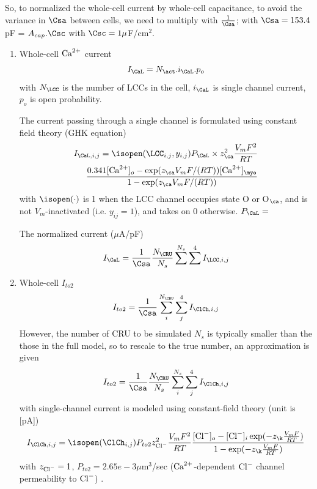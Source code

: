\begin{framed}
  So, to normalized the whole-cell current by whole-cell capacitance,
  to avoid the variance in $\Csa$ between cells, we need to multiply
  with $\frac{1}{\Csa}$; with $\Csa=153.4$pF = $A_{cap}.\Csc$ with
  $\Csc=1\mu$F/cm$^2$.
\end{framed}

\begin{enumerate}
\item Whole-cell ${\text{Ca}^{2+}}$ current~\citep{handrock1998}
  \begin{equation}
    \label{eq:1324}
    I_\CaL = N_\act . i_\CaL . p_o 
  \end{equation}
  with $N_\LCC$ is the number of LCCs in the cell, $i_\CaL$ is single
  channel current, $p_o$ is open probability.

  The current passing through a single channel is formulated using
  constant field theory (GHK equation)
  \begin{equation}
    \label{eq:1334}
    \begin{split}
      I_{\CaL,i,j} = \isopen(\LCC_{i,j},y_{i,j}) P_\CaL \times z_\ca^2
      \frac{V_mF^2}{RT} \\
      \frac{0.341[\Ca]_o-\exp(z_\ca V_mF/(RT))
        [\Ca]_\myo}{1-\exp(z_\ca V_mF/(RT))}
    \end{split}
  \end{equation}
  with $\isopen(\cdot)$ is 1 when the LCC channel occupies state O or
  O$_\ca$, and is not $V_m$-inactivated (i.e. $y_{ij}=1$), and takes
  on 0 otherwise. $P_\CaL=$

  The normalized current ($\mu$A/pF)
  \begin{equation}
    \label{eq:1335}
    I_\CaL = \frac{1}{\Csa}\frac{N_\CRU}{N_s} \sum^{N_s} \sum^4 I_{\LCC,i,j}
  \end{equation}



\item Whole-cell $I_{to2}$
  \begin{equation}
    \label{eq:1331}
    I_{to2} = \frac{1}{\Csa} \sum^{N_\CRU}_i \sum^4_j I_{\ClCh, i, j}
  \end{equation}
  However, the number of CRU to be simulated $N_s$ is typically smaller than
  the those in the full model, so to rescale to the true number, an
  approximation is given
  \begin{equation}
    \label{eq:1330}
    I_{to2} =\frac{1}{\Csa} \frac{N_\CRU}{N_s}\sum^{N_s}_i \sum^4_j I_{\ClCh, i, j}
  \end{equation}
  with single-channel current is modeled using constant-field theory
  (unit is [pA])
\begin{equation}
  \label{eq:1332}
  I_{\ClCh,i,j} = \isopen(\ClCh_{i,j}) P_{to2} z_\Cl^2
  \frac{V_mF^2}{RT} \frac{[\Cl]_o-[\Cl]_i \exp(-z_\k
    \frac{V_mF}{RT})}{1-\exp(-z_\k \frac{V_mF}{RT})}
\end{equation}
with $z_{\text{Cl}^{-}}=1$, $P_{to2} = 2.65e-3\mu$m$^3$/sec (${\text{Ca}^{2+}}$-dependent ${\text{Cl}^{-}}$
channel permeability to ${\text{Cl}^{-}}$) .
\end{enumerate}

